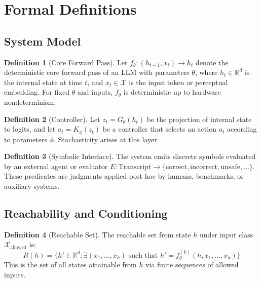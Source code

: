 \documentclass[11pt]{article}
\theoremstyle{definition}
\newtheorem{definition}{Definition}[section]
\theoremstyle{plain}
\theoremstyle{remark}
\newcommand{\X}{\mathcal{X}}
\begin{document}
\appendix
\section{Formal Definitions}
\label{sec:definitions}

\subsection{System Model}

\begin{definition}[Core Forward Pass]
Let $f_\theta : (h_{t-1}, x_t) \to h_t$ denote the deterministic core forward pass of an LLM with parameters $\theta$, where $h_t \in \mathbb{R}^d$ is the internal state at time $t$, and $x_t \in \X$ is the input token or perceptual embedding. For fixed $\theta$ and inputs, $f_\theta$ is deterministic up to hardware nondeterminism.
\end{definition}

\begin{definition}[Controller]
Let $z_t = G_\theta(h_t)$ be the projection of internal state to logits, and let $a_t = K_\phi(z_t)$ be a controller that selects an action $a_t$ according to parameters $\phi$. Stochasticity arises at this layer.
\end{definition}

\begin{definition}[Symbolic Interface]
The system emits discrete symbols evaluated by an external agent or evaluator $E : \text{Transcript} \to \{\text{correct}, \text{incorrect}, \text{unsafe}, \ldots\}$. These predicates are judgments applied post hoc by humans, benchmarks, or auxiliary systems.
\end{definition}

\subsection{Reachability and Conditioning}

\begin{definition}[Reachable Set]
The reachable set from state $h$ under input class $\X_{\text{allowed}}$ is:
\[
R(h) = \{ h' \in \mathbb{R}^d : \exists (x_1,\ldots,x_k) \text{ such that } h' = f_\theta^{(k)}(h, x_1,\ldots,x_k) \}
\]
This is the set of all states attainable from $h$ via finite sequences of allowed inputs.
\end{definition}
\end{document}
